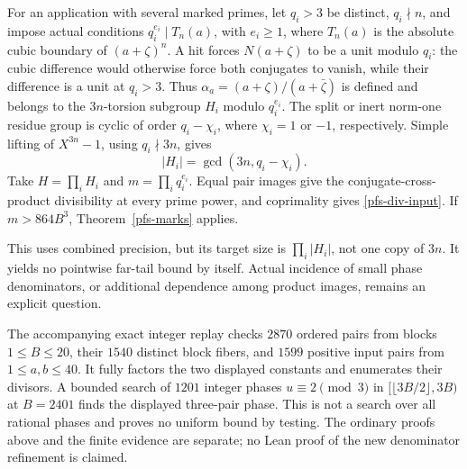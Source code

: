 For an application with several marked primes, let $q_i>3$ be
distinct, $q_i\nmid n$, and impose actual conditions
$q_i^{e_i}\mid T_n(a)$, with $e_i\geq1$, where $T_n(a)$ is
the absolute cubic boundary of $(a+\zeta)^n$. A hit forces
$N(a+\zeta)$ to be a unit modulo $q_i$: the cubic difference
would otherwise force both conjugates to vanish, while their
difference is a unit at $q_i>3$. Thus
$\alpha_a=(a+\zeta)/(a+\bar\zeta)$ is defined and belongs to
the $3n$-torsion subgroup $H_i$ modulo $q_i^{e_i}$.
The split or inert norm-one residue group is cyclic of order
$q_i-\chi_i$, where $\chi_i=1$ or $-1$, respectively. Simple
lifting of $X^{3n}-1$, using $q_i\nmid3n$, gives
\[
 |H_i|=\gcd(3n,q_i-\chi_i).
\]
Take $H=\prod_i H_i$ and $m=\prod_i q_i^{e_i}$. Equal pair images
give the conjugate-cross-product divisibility at every prime power,
and coprimality gives \eqref{pfs-div-input}. If $m>864B^3$,
Theorem~\ref{pfs-marks} applies.

This uses combined precision, but its target size is
$\prod_i|H_i|$, not one copy of $3n$. It yields no pointwise
far-tail bound by itself. Actual incidence of small phase
denominators, or additional dependence among product images,
remains an explicit question.

The accompanying exact integer replay checks $2870$ ordered pairs
from blocks $1\leq B\leq20$, their $1540$ distinct block fibers,
and $1599$ positive input pairs from $1\leq a,b\leq40$.
It fully factors the two displayed constants and enumerates their
divisors. A bounded search of $1201$ integer phases
$u\equiv2\pmod3$ in $[\lfloor3B/2\rfloor,3B)$ at $B=2401$
finds the displayed three-pair phase. This is not a search over all
rational phases and proves no uniform bound by testing.
The ordinary proofs above and the finite evidence are separate;
no Lean proof of the new denominator refinement is claimed.
